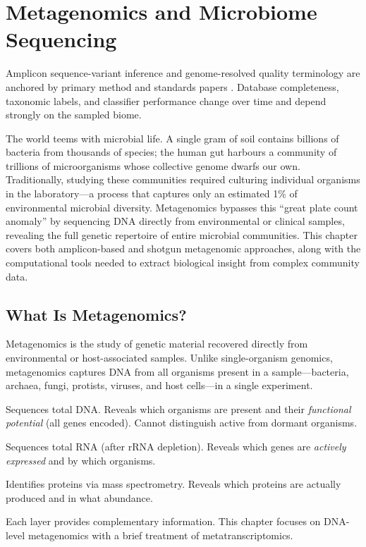 \chapter{Metagenomics and Microbiome Sequencing}
\label{ch:metagenomics}

\begin{sourcebox}
Amplicon sequence-variant inference and genome-resolved quality terminology are anchored by primary method and standards papers \cite{callahan2016}. Database completeness, taxonomic labels, and classifier performance change over time and depend strongly on the sampled biome.
\end{sourcebox}

The world teems with microbial life. A single gram of soil contains billions of bacteria from thousands of species; the human gut harbours a community of trillions of microorganisms whose collective genome dwarfs our own. Traditionally, studying these communities required culturing individual organisms in the laboratory---a process that captures only an estimated 1\% of environmental microbial diversity. Metagenomics bypasses this ``great plate count anomaly'' by sequencing DNA directly from environmental or clinical samples, revealing the full genetic repertoire of entire microbial communities. This chapter covers both amplicon-based and shotgun metagenomic approaches, along with the computational tools needed to extract biological insight from complex community data.

\section{What Is Metagenomics?}
\label{sec:metagenomics_intro}

Metagenomics is the study of genetic material recovered directly from environmental or host-associated samples. Unlike single-organism genomics, metagenomics captures DNA from all organisms present in a sample---bacteria, archaea, fungi, protists, viruses, and host cells---in a single experiment.

\begin{keyconcept}[title={Metagenomics vs.\ Metatranscriptomics vs.\ Metaproteomics}]
\begin{description}[nosep]
  \item[Metagenomics] Sequences total DNA. Reveals which organisms are present and their \emph{functional potential} (all genes encoded). Cannot distinguish active from dormant organisms.
  \item[Metatranscriptomics] Sequences total RNA (after rRNA depletion). Reveals which genes are \emph{actively expressed} and by which organisms.
  \item[Metaproteomics] Identifies proteins via mass spectrometry. Reveals which proteins are actually produced and in what abundance.
\end{description}
Each layer provides complementary information. This chapter focuses on DNA-level metagenomics with a brief treatment of metatranscriptomics.
\end{keyconcept}

